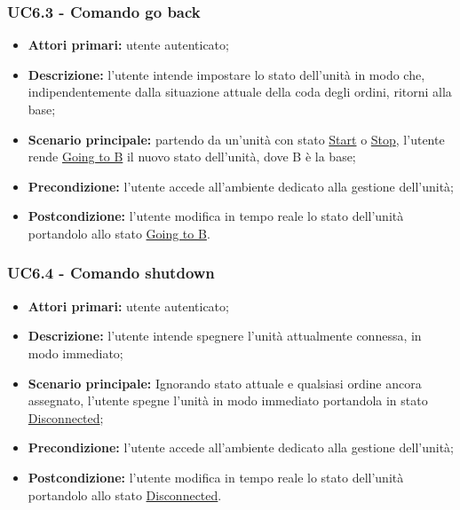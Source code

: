         \subsubsection{UC6.3 - Comando go back}
        \begin{itemize}
            \item \textbf{Attori primari:} utente autenticato;
            \item \textbf{Descrizione:} l'utente intende impostare lo stato dell'unità in modo che, indipendentemente dalla situazione attuale della coda degli ordini, ritorni alla base;
            \item \textbf{Scenario principale:} partendo da un'unità con stato \underline{Start} o \underline{Stop}, l'utente rende \underline{Going to B} il nuovo stato dell'unità, dove B è la base;
            \item \textbf{Precondizione:} l'utente accede all'ambiente dedicato alla gestione dell'unità;
            \item \textbf{Postcondizione:} l'utente modifica in tempo reale lo stato dell'unità portandolo allo stato \underline{Going to B}.
        \end{itemize}

        \subsubsection{UC6.4 - Comando shutdown}
        \begin{itemize}
            \item \textbf{Attori primari:} utente autenticato;
            \item \textbf{Descrizione:} l'utente intende spegnere l'unità attualmente connessa, in modo immediato;
            \item \textbf{Scenario principale:} Ignorando stato attuale e qualsiasi ordine ancora assegnato, l'utente spegne l'unità in modo immediato portandola in stato \underline{Disconnected};
            \item \textbf{Precondizione:} l'utente accede all'ambiente dedicato alla gestione dell'unità;
            \item \textbf{Postcondizione:} l'utente modifica in tempo reale lo stato dell'unità portandolo allo stato \underline{Disconnected}.
        \end{itemize}

